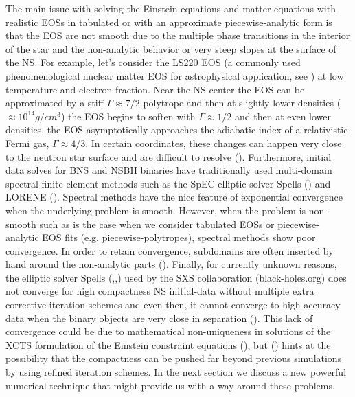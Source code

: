The main issue with solving the Einstein equations and matter equations with realistic EOSs in tabulated or with an approximate piecewise-analytic form is that the EOS are not smooth due to the multiple phase transitions in the interior of the star and the non-analytic behavior or very steep slopes at the surface of the NS. For example, let's consider the LS220 EOS (a commonly used phenomenological nuclear matter EOS for astrophysical application, see \citet*{lattimer1991generalized}) at low temperature and electron fraction. Near the NS center the EOS can be approximated by a stiff $\Gamma \approx 7/2$ polytrope and then at slightly lower densities ($\approx 10^{14} g/cm^{3}$) the EOS begins to soften with $\Gamma \approx 1/2$ and then at even lower densities, the EOS asymptotically approaches the adiabatic index of a relativistic Fermi gas, $\Gamma \approx 4/3$. In certain coordinates, these changes can happen very close to the neutron star surface and are difficult to resolve (\citet*{deaton2013black}). Furthermore, initial data solves for BNS and NSBH binaries have traditionally used multi-domain spectral finite element methods such as the SpEC elliptic solver Spells (\citet*{pfeiffer2003multidomain}) and LORENE (\citet*{gourgoulhon2001quasiequilibrium}). Spectral methods have the nice feature of exponential convergence when the underlying problem is smooth. However, when the problem is non-smooth such as is the case when we consider tabulated EOSs or piecewise-analytic EOS fits (e.g. piecewise-polytropes), spectral methods show poor convergence. In order to retain convergence, subdomains are often inserted by hand around the non-analytic parts (\citet*{deaton2013black}). 
%
Finally, for currently unknown reasons, the elliptic solver Spells (\citet*{pfeiffer2003multidomain},\citet*{foucart2008initial},\citet*{henriksson2014initial}) used by the SXS collaboration (black-holes.org) does not converge for high compactness NS initial-data without multiple extra corrective iteration schemes and even then, it cannot converge to high accuracy data when the binary objects are very close in separation (\citet*{henriksson2014initial}). This lack of convergence could be due to mathematical non-uniqueness in solutions of the XCTS formulation of the Einstein constraint equations (\citet*{cordero2009improved}), but (\citet*{henriksson2014initial}) hints at the possibility that the compactness can be pushed far beyond previous simulations by using refined iteration schemes. In the next section we discuss a new powerful numerical technique that might provide us with a way around these problems.

